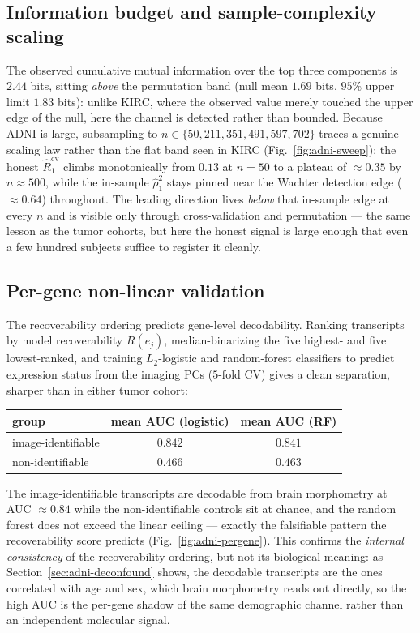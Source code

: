\documentclass{article}
\begin{document}
\subsection{Information budget and sample-complexity scaling}
\label{sec:adni-sweep}
The observed cumulative mutual information over the top three components is
$2.44$ bits, sitting \emph{above} the permutation band (null mean $1.69$ bits,
$95\%$ upper limit $1.83$ bits): unlike KIRC, where the observed value merely
touched the upper edge of the null, here the channel is detected rather than
bounded. Because ADNI is large, subsampling to
$n \in \{50, 211, 351, 491, 597, 702\}$ traces a genuine scaling law rather than
the flat band seen in KIRC (Fig.~\ref{fig:adni-sweep}): the honest $\hat
R_1^{\mathrm{cv}}$ climbs monotonically from $0.13$ at $n=50$ to a plateau of
$\approx 0.35$ by $n \approx 500$, while the in-sample $\hat\rho_1^2$ stays
pinned near the Wachter detection edge ($\approx 0.64$) throughout. The leading
direction lives \emph{below} that in-sample edge at every $n$ and is visible
only through cross-validation and permutation --- the same lesson as the tumor
cohorts, but here the honest signal is large enough that even a few hundred
subjects suffice to register it cleanly.

\subsection{Per-gene non-linear validation}
\label{sec:adni-pergene}
The recoverability ordering predicts gene-level decodability. Ranking
transcripts by model recoverability $R(e_j)$, median-binarizing the five
highest- and five lowest-ranked, and training $L_2$-logistic and random-forest
classifiers to predict expression status from the imaging PCs ($5$-fold CV)
gives a clean separation, sharper than in either tumor cohort:
\begin{center}
\begin{tabular}{lcc}
\toprule
group               & mean AUC (logistic) & mean AUC (RF) \\
\midrule
image-identifiable  & $0.842$ & $0.841$ \\
non-identifiable    & $0.466$ & $0.463$ \\
\bottomrule
\end{tabular}
\end{center}
The image-identifiable transcripts are decodable from brain morphometry at
AUC $\approx 0.84$ while the non-identifiable controls sit at chance, and the
random forest does not exceed the linear ceiling --- exactly the falsifiable
pattern the recoverability score predicts (Fig.~\ref{fig:adni-pergene}). This
confirms the \emph{internal consistency} of the recoverability ordering, but
not its biological meaning: as Section~\ref{sec:adni-deconfound} shows, the
decodable transcripts are the ones correlated with age and sex, which brain
morphometry reads out directly, so the high AUC is the per-gene shadow of the
same demographic channel rather than an independent molecular signal.
\end{document}
